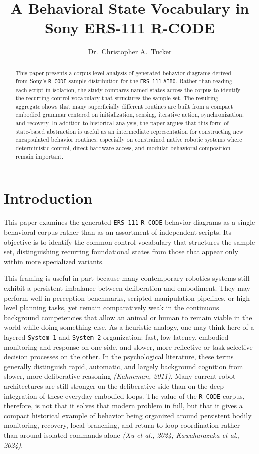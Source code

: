 \documentclass[11pt]{article}
\title{A Behavioral State Vocabulary in Sony ERS-111 R-CODE}
\author{Dr.\ Christopher A.\ Tucker}
\date{}
\begin{document}
\maketitle

\begin{abstract}
This paper presents a corpus-level analysis of generated behavior
diagrams derived from Sony's \texttt{R-CODE} sample distribution for the
\texttt{ERS-111} \texttt{AIBO}. Rather than reading each script in
isolation, the study compares named states across the corpus to
identify the recurring control vocabulary that structures the sample
set. The resulting aggregate shows that many superficially different
routines are built from a compact embodied grammar centered on
initialization, sensing, iterative action, synchronization, and
recovery. In addition to historical analysis, the paper argues that
this form of state-based abstraction is useful as an intermediate
representation for constructing new encapsulated behavior routines,
especially on constrained native robotic systems where deterministic
control, direct hardware access, and modular behavioral composition
remain important.
\end{abstract}

\section*{Introduction}

This paper examines the generated \texttt{ERS-111} \texttt{R-CODE}
behavior diagrams as a single behavioral corpus rather than as an
assortment of independent scripts. Its objective is to identify the
common control vocabulary that structures the sample set,
distinguishing recurring foundational states from those that appear
only within more specialized variants.

This framing is useful in part because many contemporary robotics
systems still exhibit a persistent imbalance between deliberation and
embodiment. They may perform well in perception benchmarks, scripted
manipulation pipelines, or high-level planning tasks, yet remain
comparatively weak in the continuous background competencies that allow
an animal or human to remain viable in the world while doing something
else. As a heuristic analogy, one may think here of a layered
\texttt{System 1} and \texttt{System 2} organization: fast,
low-latency, embodied monitoring and response on one side, and slower,
more reflective or task-selective decision processes on the other. In
the psychological literature, these terms generally distinguish rapid,
automatic, and largely background cognition from slower, more
deliberative reasoning \textit{(Kahneman, 2011)}. Many current robot architectures are still
stronger on the deliberative
side than on the deep integration of these everyday embodied loops.
The value of the \texttt{R-CODE} corpus, therefore, is not that it
solves that modern problem in full, but that it gives a compact
historical example of behavior being organized around persistent bodily
monitoring, recovery, local branching, and return-to-loop coordination
rather than around isolated commands alone \textit{(Xu et al., 2024; Kawaharazuka et al., 2024)}.
\end{document}
